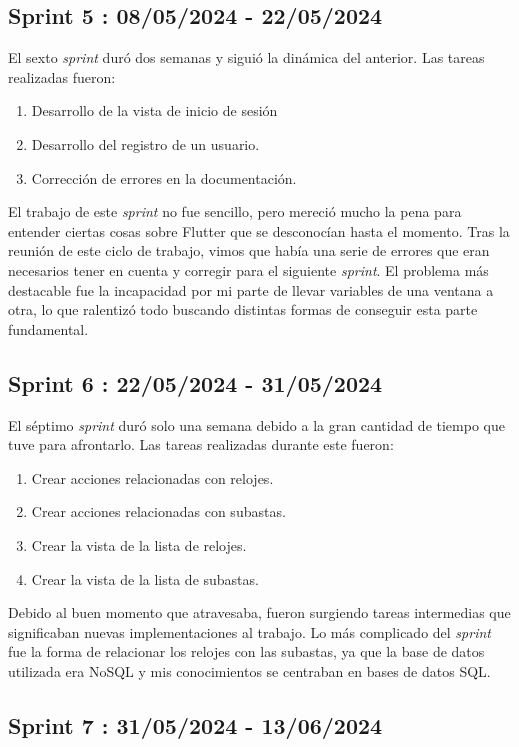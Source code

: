 \subsection{Sprint 5 : 08/05/2024 - 22/05/2024}

	El sexto \emph{sprint} duró dos semanas y siguió la dinámica del anterior. Las tareas realizadas fueron:
	\begin{enumerate}
		\item Desarrollo de la vista de inicio de sesión
		\item Desarrollo del registro de un usuario.
		\item Corrección de errores en la documentación.
	\end{enumerate}
	El trabajo de este \emph{sprint} no fue sencillo, pero mereció mucho la pena para entender ciertas cosas sobre Flutter que se desconocían hasta el momento. Tras la reunión de este ciclo de trabajo, vimos que había una serie de errores que eran necesarios tener en cuenta y corregir para el siguiente \emph{sprint}. El problema más destacable fue la incapacidad por mi parte de llevar variables de una ventana a otra, lo que ralentizó todo buscando distintas formas de conseguir esta parte fundamental.
	
\subsection{Sprint 6 : 22/05/2024 - 31/05/2024}

	El séptimo \emph{sprint} duró solo una semana debido a la gran cantidad de tiempo que tuve para afrontarlo. Las tareas realizadas durante este fueron:
	\begin{enumerate}
		\item Crear acciones relacionadas con relojes.
		\item Crear acciones relacionadas con subastas.
		\item Crear la vista de la lista de relojes.
		\item Crear la vista de la lista de subastas.
	\end{enumerate}
	Debido al buen momento que atravesaba, fueron surgiendo tareas intermedias que significaban nuevas implementaciones al trabajo. Lo más complicado del \emph{sprint} fue la forma de relacionar los relojes con las subastas, ya que la base de datos utilizada era NoSQL y mis conocimientos se centraban en bases de datos SQL.
	
\subsection{Sprint 7 : 31/05/2024 - 13/06/2024}

